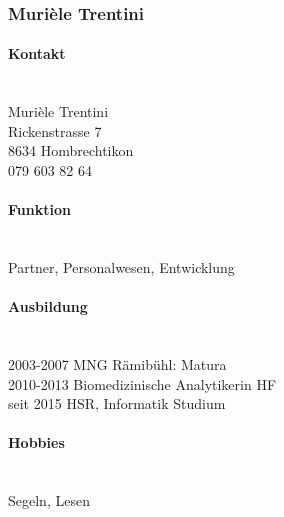 \subsubsection{Murièle Trentini}
\noindent\begin{minipage}{0.7\textwidth}
	\paragraph{Kontakt} \hfill \\
	Murièle Trentini \\
	Rickenstrasse 7 \\
	8634 Hombrechtikon \\
	079 603 82 64 \\
	
	\paragraph{Funktion} \hfill \\
	Partner, Personalwesen, Entwicklung \\
	
	\paragraph{Ausbildung} \hfill \\
	2003-2007 \hspace{2cm} MNG Rämibühl: Matura \\
	2010-2013 \hspace{2cm} Biomedizinische Analytikerin HF \\
	seit 2015\hspace{2.3cm} HSR, Informatik Studium\\
	
	\paragraph{Hobbies} \hfill \\
	Segeln, Lesen \\
\end{minipage}
\hfill
